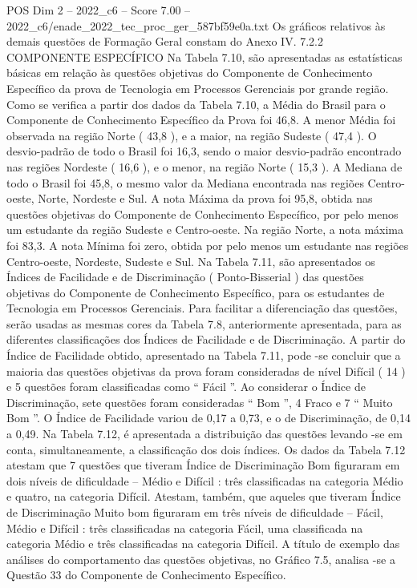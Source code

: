 \begin{textsample}{POS Dim 2 – 2022\_c6 – Score 7.00 – 2022\_c6/enade\_2022\_tec\_proc\_ger\_587bf59e0a.txt}
Os gráficos relativos às demais questões de Formação Geral constam do Anexo IV. 7.2.2 COMPONENTE ESPECÍFICO Na Tabela 7.10, são apresentadas as estatísticas básicas em relação às questões objetivas do Componente de Conhecimento Específico da prova de Tecnologia em Processos Gerenciais por grande região.
Como se verifica a partir dos dados da Tabela 7.10, a Média do Brasil para o Componente de Conhecimento Específico da Prova foi 46,8.
A menor Média foi observada na região Norte ( 43,8 ), e a maior, na região Sudeste ( 47,4 ).
O desvio-padrão de todo o Brasil foi 16,3, sendo o maior desvio-padrão encontrado nas regiões Nordeste ( 16,6 ), e o menor, na região Norte ( 15,3 ).
A Mediana de todo o Brasil foi 45,8, o mesmo valor da Mediana encontrada nas regiões Centro-oeste, Norte, Nordeste e Sul.
A nota Máxima da prova foi 95,8, obtida nas questões objetivas do Componente de Conhecimento Específico, por pelo menos um estudante da região Sudeste e Centro-oeste.
Na região Norte, a nota máxima foi 83,3.
A nota Mínima foi zero, obtida por pelo menos um estudante nas regiões Centro-oeste, Nordeste, Sudeste e Sul.
Na Tabela 7.11, são apresentados os Índices de Facilidade e de Discriminação ( Ponto-Bisserial ) das questões objetivas do Componente de Conhecimento Específico, para os estudantes de Tecnologia em Processos Gerenciais.
Para facilitar a diferenciação das questões, serão usadas as mesmas cores da Tabela 7.8, anteriormente apresentada, para as diferentes classificações dos Índices de Facilidade e de Discriminação.
A partir do Índice de Facilidade obtido, apresentado na Tabela 7.11, pode -se concluir que a maioria das questões objetivas da prova foram consideradas de nível Difícil ( 14 ) e 5 questões foram classificadas como “ Fácil ”.
Ao considerar o Índice de Discriminação, sete questões foram consideradas “ Bom ”, 4 Fraco e 7 “ Muito Bom ”.
O Índice de Facilidade variou de 0,17 a 0,73, e o de Discriminação, de 0,14 a 0,49.
Na Tabela 7.12, é apresentada a distribuição das questões levando -se em conta, simultaneamente, a classificação dos dois índices.
Os dados da Tabela 7.12 atestam que 7 questões que tiveram Índice de Discriminação Bom figuraram em dois níveis de dificuldade – Médio e Difícil : três classificadas na categoria Médio e quatro, na categoria Difícil.
Atestam, também, que aqueles que tiveram Índice de Discriminação Muito bom figuraram em três níveis de dificuldade – Fácil, Médio e Difícil : três classificadas na categoria Fácil, uma classificada na categoria Médio e três classificadas na categoria Difícil.
A título de exemplo das análises do comportamento das questões objetivas, no Gráfico 7.5, analisa -se a Questão 33 do Componente de Conhecimento Específico.

\end{textsample}

